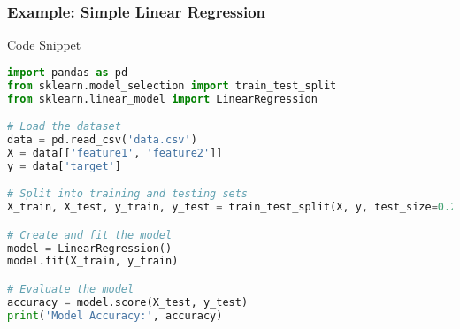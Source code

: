 \documentclass{beamer}
\begin{document}
\begin{frame}[fragile]
    \frametitle{Example: Simple Linear Regression}
    \begin{block}{Code Snippet}
    \begin{lstlisting}[language=Python]
import pandas as pd
from sklearn.model_selection import train_test_split
from sklearn.linear_model import LinearRegression

# Load the dataset
data = pd.read_csv('data.csv')
X = data[['feature1', 'feature2']]
y = data['target']

# Split into training and testing sets
X_train, X_test, y_train, y_test = train_test_split(X, y, test_size=0.2, random_state=42)

# Create and fit the model
model = LinearRegression()
model.fit(X_train, y_train)

# Evaluate the model
accuracy = model.score(X_test, y_test)
print('Model Accuracy:', accuracy)
    \end{lstlisting}
    \end{block}
\end{frame}
\end{document}
